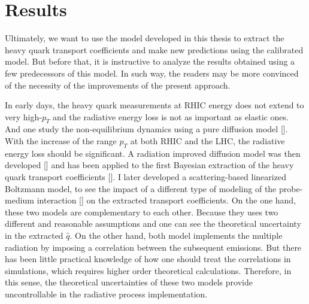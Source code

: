\chapter{Results}
Ultimately, we want to use the model developed in this thesis to extract the heavy quark transport coefficients and make new predictions using the calibrated model.
But before that, it is instructive to analyze the results obtained using a few predecessors of this model.
In such way, the readers may be more convinced of the necessity of the improvements of the present approach. 

In early days, the heavy quark measurements at RHIC energy does not extend to very high-$p_T$ and the radiative energy loss is not as important as elastic ones.
And one study the non-equilibrium dynamics using a pure diffusion model []. 
With the increase of the range $p_T$ at both RHIC and the LHC, the radiative energy loss should be significant.
A radiation improved diffusion model was then developed [] and has been applied to the first Bayesian extraction of the heavy quark transport coefficients [].
I later developed a scattering-based linearized Boltzmann model, to see the impact of a different type of modeling of the probe-medium interaction [] on the extracted transport coefficients.
On the one hand, these two models are complementary to each other.
Because they uses two different and reasonable assumptions and one can see the theoretical uncertainty in the extracted $\hat{q}$.
On the other hand, both model implements the multiple radiation by imposing a correlation between the subsequent emissions.
But there has been little practical knowledge of how one should treat the correlations in simulations, which requires higher order theoretical calculations.
Therefore, in this sense, the theoretical uncertainties of these two models provide uncontrollable in the radiative process implementation.


